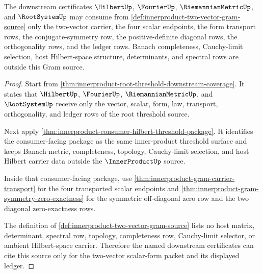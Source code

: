 \begin{theorem}
\label{thm:innerproduct-gram-consumer-boundary}
The downstream certificates $\HilbertUp$, $\FourierUp$,
$\RiemannianMetricUp$, and $\RootSystemUp$ may consume from
\autoref{def:innerproduct-two-vector-gram-source} only the two-vector
carrier, the four scalar endpoints, the form transport rows, the
conjugate-symmetry row, the positive-definite diagonal rows, the
orthogonality rows, and the ledger rows. Banach completeness,
Cauchy-limit selection, host Hilbert-space structure, determinants, and
spectral rows are outside this Gram source.
\end{theorem}
\begin{proof}
Start from \autoref{thm:innerproduct-root-threshold-downstream-coverage}. It
states that $\HilbertUp$, $\FourierUp$, $\RiemannianMetricUp$, and
$\RootSystemUp$ receive only the vector, scalar, form, law, transport,
orthogonality, and ledger rows of the root threshold source.

Next apply
\autoref{thm:innerproduct-consumer-hilbert-threshold-package}. It identifies
the consumer-facing package as the same inner-product threshold surface and
keeps Banach metric, completeness, topology, Cauchy-limit selection, and host
Hilbert carrier data outside the $\InnerProductUp$ source.

Inside that consumer-facing package, use
\autoref{thm:innerproduct-gram-carrier-transport} for the four transported
scalar endpoints and
\autoref{thm:innerproduct-gram-symmetry-zero-exactness} for the symmetric
off-diagonal zero row and the two diagonal zero-exactness rows.

The definition of \autoref{def:innerproduct-two-vector-gram-source} lists no
host matrix, determinant, spectral row, topology, completeness row,
Cauchy-limit selector, or ambient Hilbert-space carrier. Therefore the named
downstream certificates can cite this source only for the two-vector
scalar-form packet and its displayed ledger.
\end{proof}

